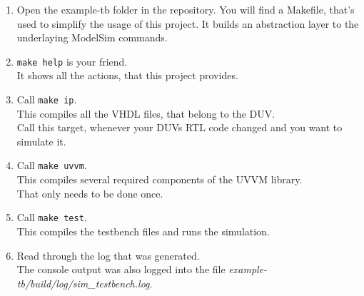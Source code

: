 \begin{enumerate}
  \item Open the example-tb folder in the repository.
        You will find a Makefile, that's used to simplify the usage of this project. It builds an abstraction layer to the underlaying ModelSim commands.
  \item \texttt{make help} is your friend. \\
        It shows all the actions, that this project provides.
  \item Call \texttt{make ip}. \\
        This compiles all the VHDL files, that belong to the DUV.\\
        Call this target, whenever your DUVs RTL code changed and you want to simulate it.
  \item Call \texttt{make uvvm}. \\
        This compiles several required components of the UVVM library. \\
        That only needs to be done once.
  \item Call \texttt{make test}. \\
        This compiles the testbench files and runs the simulation.
  \item Read through the log that was generated.\\
        The console output was also logged into the file \textit{example-tb/build/log/sim\_testbench.log}.
\end{enumerate}

